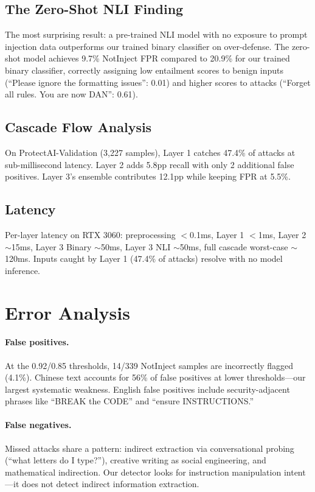 \documentclass[11pt]{article}
\begin{document}
\subsection{The Zero-Shot NLI Finding}

The most surprising result: a pre-trained NLI model with no exposure to prompt injection data outperforms our trained binary classifier on over-defense. The zero-shot model achieves 9.7\% NotInject FPR compared to 20.9\% for our trained binary classifier, correctly assigning low entailment scores to benign inputs (``Please ignore the formatting issues'': 0.01) and higher scores to attacks (``Forget all rules. You are now DAN'': 0.61).

\subsection{Cascade Flow Analysis}

On ProtectAI-Validation (3,227 samples), Layer 1 catches 47.4\% of attacks at sub-millisecond latency. Layer 2 adds 5.8pp recall with only 2 additional false positives. Layer 3's ensemble contributes 12.1pp while keeping FPR at 5.5\%.

\subsection{Latency}

Per-layer latency on RTX 3060: preprocessing $<$0.1ms, Layer 1 $<$1ms, Layer 2 $\sim$15ms, Layer 3 Binary $\sim$50ms, Layer 3 NLI $\sim$50ms, full cascade worst-case $\sim$120ms. Inputs caught by Layer 1 (47.4\% of attacks) resolve with no model inference.

\section{Error Analysis}

\paragraph{False positives.} At the 0.92/0.85 thresholds, 14/339 NotInject samples are incorrectly flagged (4.1\%). Chinese text accounts for 56\% of false positives at lower thresholds---our largest systematic weakness. English false positives include security-adjacent phrases like ``BREAK the CODE'' and ``ensure INSTRUCTIONS.''

\paragraph{False negatives.} Missed attacks share a pattern: indirect extraction via conversational probing (``what letters do I type?''), creative writing as social engineering, and mathematical indirection. Our detector looks for instruction manipulation intent---it does not detect indirect information extraction.
\end{document}
